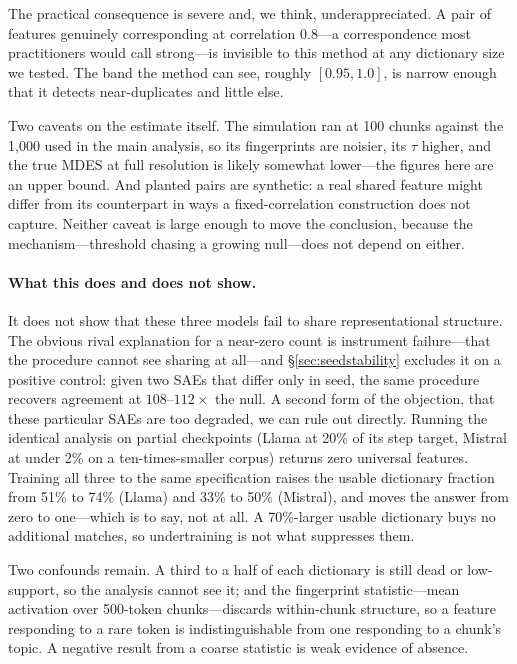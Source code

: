 \documentclass[11pt]{article}
\begin{document}
The practical consequence is severe and, we think, underappreciated. A pair of features
genuinely corresponding at correlation 0.8---a correspondence most practitioners would
call strong---is invisible to this method at any dictionary size we tested. The band the
method can see, roughly $[0.95, 1.0]$, is narrow enough that it detects near-duplicates
and little else.

Two caveats on the estimate itself. The simulation ran at 100 chunks against the 1,000
used in the main analysis, so its fingerprints are noisier, its $\tau$ higher, and the true
MDES at full resolution is likely somewhat lower---the figures here are an upper bound. And
planted pairs are synthetic: a real shared feature might differ from its counterpart in
ways a fixed-correlation construction does not capture. Neither caveat is large enough to
move the conclusion, because the mechanism---threshold chasing a growing null---does not
depend on either.

\paragraph{What this does and does not show.} It does not show that these three models
fail to share representational structure. The obvious rival explanation for a near-zero
count is instrument failure---that the procedure cannot see sharing at all---and
\S\ref{sec:seedstability} excludes it on a positive control: given two SAEs that differ
only in seed, the same procedure recovers agreement at $108$--$112\times$ the null. A
second form of the objection, that these particular SAEs are too degraded, we can rule
out directly. Running the identical analysis on
partial checkpoints (Llama at 20\% of its step target, Mistral at under 2\% on a
ten-times-smaller corpus) returns zero universal features. Training all three to the same
specification raises the usable dictionary fraction from 51\% to 74\% (Llama) and 33\% to
50\% (Mistral), and moves the answer from zero to one---which is to say, not at all. A
70\%-larger usable dictionary buys no additional matches, so undertraining is not what
suppresses them.

Two confounds remain. A third to a half of each dictionary is still dead or
low-support, so the analysis cannot see it; and the fingerprint statistic---mean
activation over 500-token chunks---discards within-chunk structure, so a feature
responding to a rare token is indistinguishable from one responding to a chunk's topic.
A negative result from a coarse statistic is weak evidence of absence.
\end{document}
